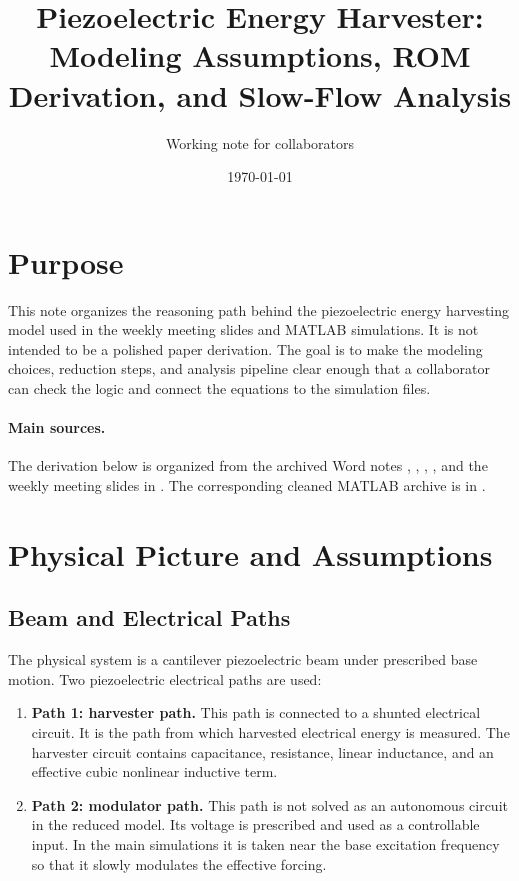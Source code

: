 \documentclass[11pt]{article}
\title{Piezoelectric Energy Harvester: Modeling Assumptions, ROM Derivation, and Slow-Flow Analysis}
\author{Working note for collaborators}
\date{\today}
\begin{document}
\maketitle

\section*{Purpose}

This note organizes the reasoning path behind the piezoelectric energy
harvesting model used in the weekly meeting slides and MATLAB simulations.  It
is not intended to be a polished paper derivation.  The goal is to make the
modeling choices, reduction steps, and analysis pipeline clear enough that a
collaborator can check the logic and connect the equations to the simulation
files.

\paragraph{Main sources.}
The derivation below is organized from the archived Word notes
,
,
,
, and the weekly meeting slides in
.  The corresponding cleaned MATLAB archive is in
.

\section{Physical Picture and Assumptions}

\subsection{Beam and Electrical Paths}

The physical system is a cantilever piezoelectric beam under prescribed base
motion.  Two piezoelectric electrical paths are used:

\begin{enumerate}
  \item \textbf{Path 1: harvester path.}  This path is connected to a shunted
  electrical circuit.  It is the path from which harvested electrical energy is
  measured.  The harvester circuit contains capacitance, resistance, linear
  inductance, and an effective cubic nonlinear inductive term.
  \item \textbf{Path 2: modulator path.}  This path is not solved as an
  autonomous circuit in the reduced model.  Its voltage is prescribed and used
  as a controllable input.  In the main simulations it is taken near the base
  excitation frequency so that it slowly modulates the effective forcing.
\end{enumerate}
\end{document}
